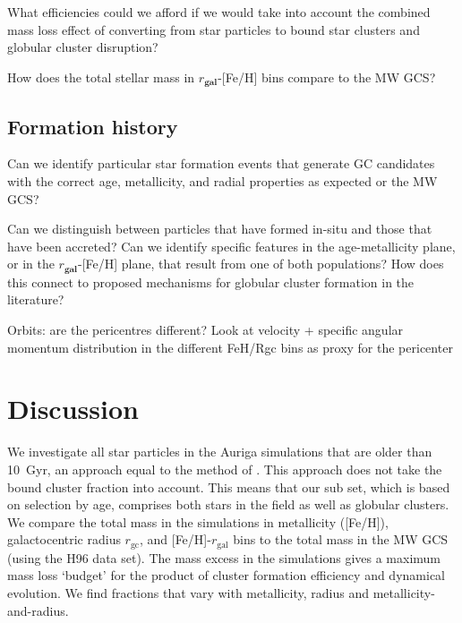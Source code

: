 \documentclass[a4paper,fleqn,usenatbib]{mnras}
\begin{document}
What efficiencies could we afford if we would take into account the combined mass loss effect of converting from star particles to bound star clusters and globular cluster disruption?

How does the total stellar mass in $r_\textbf{gal}$-[Fe/H] bins compare to the MW GCS?



\subsection{Formation history} 
\label{sec:history}
Can we identify particular star formation events that generate GC candidates with the correct age, metallicity, and radial properties as expected or the MW GCS?

Can we distinguish between particles that have formed in-situ and those that have been accreted? Can we identify specific features in the age-metallicity plane, or in the $r_\textbf{gal}$-[Fe/H] plane, that result from one of both populations? How does this connect to proposed mechanisms for globular cluster formation in the literature?


Orbits: are the pericentres different? Look at velocity + specific angular momentum distribution in the different FeH/Rgc bins as proxy for the pericenter




\section{Discussion}
\label{sec:discussion}

We investigate all star particles in the Auriga simulations that are older than 10~Gyr,
an approach equal to the method of \citep{2017MNRAS.465.3622R}. This approach does not
take the bound cluster fraction \citep[e.g.][]{2012MNRAS.426.3008K} into account. This
means that our sub set, which is based on selection by age, comprises both stars in the
field as well as globular clusters. We compare the total mass in the simulations in 
metallicity ([Fe/H]), galactocentric radius $r_{\text{gc}}$, and [Fe/H]-$r_{\text{gal}}$ 
bins to the total mass in the MW GCS (using the H96 data set). The mass excess in the
simulations gives a maximum mass loss `budget' for the product of cluster formation 
efficiency and dynamical evolution. We find fractions that vary with metallicity,
radius and metallicity-and-radius.

\end{document}
